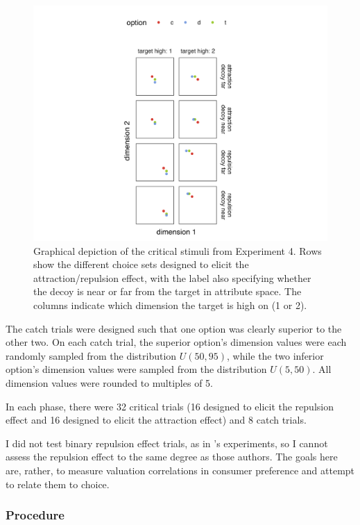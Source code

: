 \begin{figure}
    \includegraphics[width=150mm,scale=0.5]{figures/ce_rating_stim_for_paper.jpeg}
    \caption{Graphical depiction of the critical stimuli from Experiment 4. Rows show the different choice sets designed to elicit the attraction/repulsion effect, with the label also specifying whether the decoy is near or far from the target in attribute space. The columns indicate which dimension the target is high on (1 or 2).}
    \label{fig:ce_rating_stim}
\end{figure}

The catch trials were designed such that one option was clearly superior to the other two. On each catch trial, the superior option's dimension values were each randomly sampled from the distribution $U(50,95)$, while the two inferior option's dimension values were sampled from the distribution $U(5,50)$. All dimension values were rounded to multiples of 5. 

In each phase, there were 32 critical trials (16 designed to elicit the repulsion effect and 16 designed to elicit the attraction effect) and 8 catch trials.

I did not test binary repulsion effect trials, as in \textcite{banerjeeFactorsThatPromote2024}'s experiments, so I cannot assess the repulsion effect to the same degree as those authors. The goals here are, rather, to measure valuation correlations in consumer preference and attempt to relate them to choice.

\subsubsection{Procedure}

